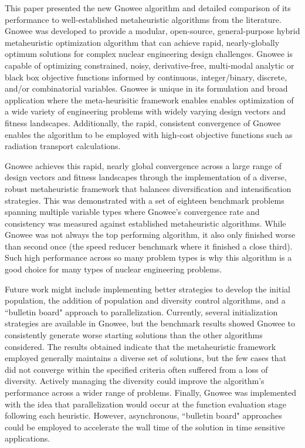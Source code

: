 \documentclass{article}                                                                           %
\begin{document}
This paper presented the new Gnowee algorithm and detailed comparison of its performance to well-established metaheuristic algorithms from the literature.
Gnowee was developed to provide a modular, open-source, general-purpose hybrid metaheuristic optimization algorithm that can achieve rapid, nearly-globally optimum solutions for complex nuclear engineering design challenges.
Gnowee is capable of optimizing constrained, noisy, derivative-free, multi-modal analytic or black box objective functions informed by continuous, integer/binary, discrete, and/or combinatorial variables.
Gnowee is unique in its formulation and broad application where the meta-heurisitic framework enables enables optimization of a wide variety of engineering problems with widely varying design vectors and fitness landscapes.
Additionally, the rapid, consistent convergence of Gnowee enables the algorithm to be employed with high-cost objective functions such as radiation transport calculations.

Gnowee achieves this rapid, nearly global convergence across a large range of design vectors and fitness landscapes through the implementation of a diverse, robust metaheuristic framework that balances diversification and intensification strategies.
This was demonstrated with a set of eighteen benchmark problems spanning multiple variable types where Gnowee's convergence rate and consistency was measured against established metaheuristic algorithms.
While Gnowee was not always the top performing algorithm, it also only finished worse than second once (the speed reducer benchmark where it finished a close third).
Such high performance across so many problem types is why this algorithm is a good choice for many types of nuclear engineering problems. 

Future work might include implementing better strategies to develop the initial population, the addition of population and diversity control algorithms, and a ``bulletin board" approach to parallelization. 
Currently, several initialization strategies are available in Gnowee, but the benchmark results showed Gnowee to consistently generate worse starting solutions than the other algorithms considered.
The results obtained indicate that the metaheuristic framework employed generally maintains a diverse set of solutions, but the few cases that did not converge within the specified criteria often suffered from a loss of diversity.
Actively managing the diversity could improve the algorithm's performance across a wider range of problems.
Finally, Gnowee was implemented with the idea that parallelization would occur at the function evaluation stage following each heuristic.
However, asynchronous, ``bulletin board" approaches could be employed to accelerate the wall time of the solution in time sensitive applications.
\end{document}
